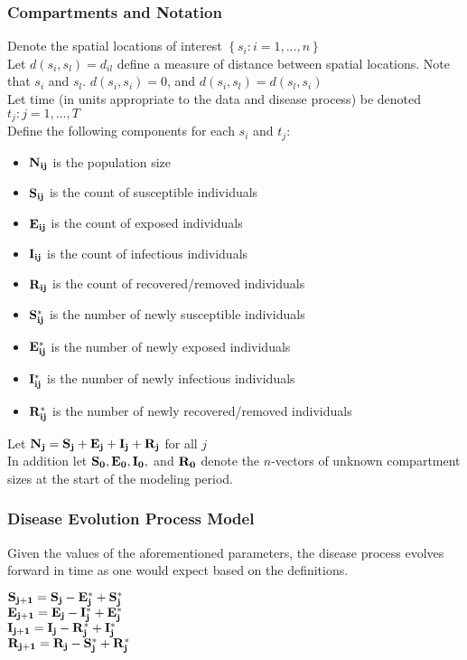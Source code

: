 \documentclass[12pt]{article}
\newcommand \mbreak {\\ \vspace{0.1in}}
\begin{document}
    \subsubsection{Compartments and Notation}
        Denote the spatial locations of interest $\left\{s_i : i = 1, ...,n \right\}$ \mbreak
        Let $d(s_i, s_l) = d_{il}$ define a measure of distance between 
        spatial locations. Note that $s_i$ and $s_l$. $d(s_i, s_i) = 0$, and $d(s_i, s_l) = d(s_l, s_i)$ \mbreak
        Let time (in units appropriate to the data and disease process) be denoted ${t_j : j = 1, ...,T}$ \mbreak
        Define the following components for each $s_i$ and $t_j$: \mbreak

        \begin{itemize}
            \item {$\bf{N_{ij}}$} is the population size
            \item {$\bf{S_{ij}}$} is the count of susceptible individuals
            \item {$\bf{E_{ij}}$} is the count of exposed individuals
            \item {$\bf{I_{ij}}$} is the count of infectious individuals
            \item {$\bf{R_{ij}}$} is the count of recovered/removed individuals
            \item {$\bf{S^*_{ij}}$} is the number of newly susceptible individuals
            \item {$\bf{E^*_{ij}}$} is the number of newly exposed individuals
            \item {$\bf{I^*_{ij}}$} is the number of newly infectious individuals
            \item {$\bf{R^*_{ij}}$} is the number of newly recovered/removed individuals
        \end{itemize}
        Let {$\bf{N_j} = \bf{S_j + E_j + I_j + R_j}$} for all $j$\\
        In addition let ${\bf{S_0, E_0, I_0,}}$ and ${\bf{R_0}}$ denote the $n$-vectors of unknown compartment sizes at the 
        start of the modeling period. 
        

    \subsubsection{Disease Evolution Process Model}
    Given the values of the aforementioned parameters, the disease process evolves forward in time 
    as one would expect based on the definitions.  
    \begin{center}
        $\bf{S_{j+1}} = \bf{S_j} - \bf{E_j^*} + \bf{S_j^*}$\mbreak
        $\bf{E_{j+1}} = \bf{E_j} - \bf{I_j^*} + \bf{E_j^*}$\mbreak
        $\bf{I_{j+1}} = \bf{I_j} - \bf{R_j^*} + \bf{I_j^*}$\mbreak
        $\bf{R_{j+1}} = \bf{R_j} - \bf{S_j^*} + \bf{R_j^*}$\mbreak
    \end{center}
    \vspace{0.15in}
\end{document}
